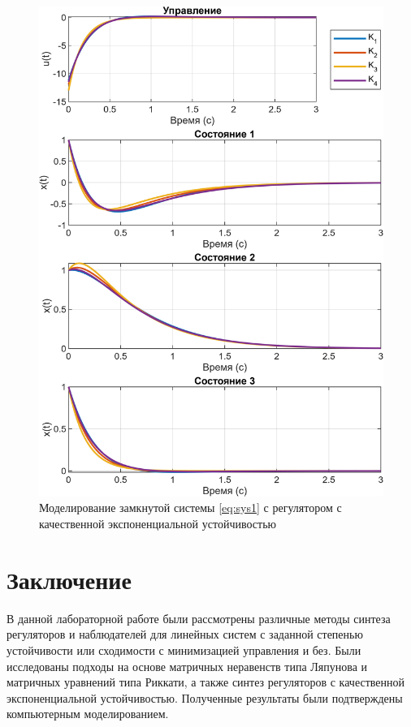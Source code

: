 \begin{figure}[H]
    \centering
    \includegraphics[width=\linewidth]{figs/task31.png}
    \caption{Моделирование замкнутой системы \eqref{eq:sys1} с регулятором с
    качественной экспоненциальной устойчивостью}
    \label{fig:riccati2}
\end{figure}


\section{Заключение}

В данной лабораторной работе были рассмотрены различные методы синтеза регуляторов 
и наблюдателей для линейных систем с заданной степенью устойчивости или сходимости 
с минимизацией управления и без. 
Были исследованы подходы на 
основе матричных неравенств типа Ляпунова и матричных уравнений типа Риккати, 
а также синтез регуляторов с качественной экспоненциальной устойчивостью. 
Полученные результаты были подтверждены компьютерным моделированием.
